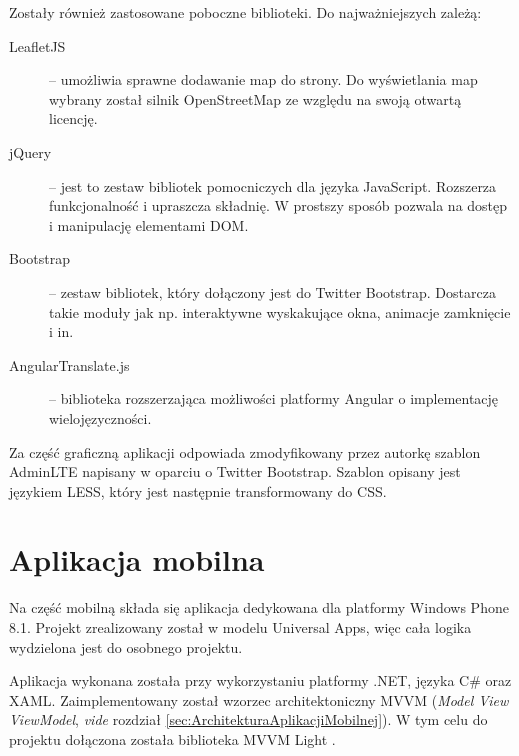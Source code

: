 \documentclass{book}
\begin{document}
		Zostały również zastosowane poboczne biblioteki. Do najważniejszych zależą:
		
		\begin{description}
			
			\item[LeafletJS] \cite{id:Leaflet} -- 
			umożliwia sprawne dodawanie map do strony. Do wyświetlania map wybrany został silnik OpenStreetMap \cite{id:OpenStreetMaps} ze względu na swoją otwartą licencję.
			\item[jQuery] \cite{id:jQuery} -- 
			jest to zestaw bibliotek pomocniczych dla języka JavaScript. Rozszerza funkcjonalność i upraszcza składnię. W prostszy sposób pozwala na dostęp i manipulację elementami DOM.
			\item[Bootstrap] \cite{id:Bootstrap} -- 
			zestaw bibliotek, który dołączony jest do Twitter Bootstrap. Dostarcza takie moduły jak np. interaktywne wyskakujące okna, animacje zamknięcie i in.
			\item[AngularTranslate.js] \cite{id:AngularTranslate} -- 
			biblioteka rozszerzająca możliwości platformy Angular o implementację wielojęzyczności.  
		
		\end{description}
				
		Za część graficzną aplikacji odpowiada zmodyfikowany przez autorkę szablon AdminLTE \cite{id:AdminLTE} napisany w oparciu o Twitter Bootstrap. Szablon opisany jest językiem LESS, który jest następnie transformowany do CSS.
		
		\section{Aplikacja mobilna}		
	
		Na część mobilną składa się aplikacja dedykowana dla platformy Windows Phone 8.1. Projekt zrealizowany został w modelu Universal Apps, więc cała logika wydzielona jest do osobnego projektu.
		
		Aplikacja wykonana została przy wykorzystaniu platformy .NET, języka C\# oraz XAML. Zaimplementowany został wzorzec architektoniczny MVVM (\emph{Model View ViewModel}, \emph{vide} rozdział \ref{sec:ArchitekturaAplikacjiMobilnej}). W tym celu do projektu dołączona została biblioteka MVVM Light \cite{id:MVVMLight}. 
		
\end{document}
